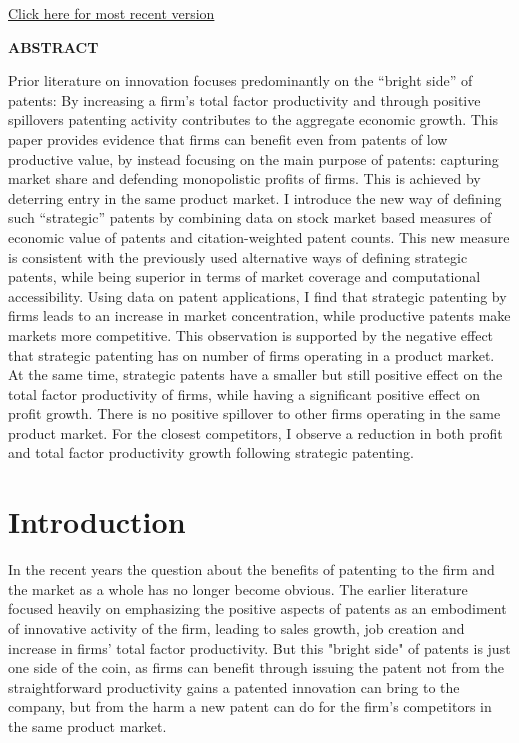 \documentclass[11pt]{article}
\begin{document}
\centerline{\href{https://drive.google.com/open?id=16sPbbTuUI3Qpzp1b1G8gfT1VrnZ90d62}{Click here for most recent version}}
\centerline{\bf ABSTRACT}
  \noindent 
  Prior literature on innovation focuses predominantly on the “bright side” of patents: By increasing a firm’s total factor productivity and through positive spillovers patenting activity contributes to the aggregate economic growth. This paper provides evidence that firms can benefit even from patents of low productive value, by instead focusing on the main purpose of patents: capturing market share and defending monopolistic profits of firms. This is achieved by deterring entry in the same product market. I introduce the new way of defining such “strategic” patents by combining data on stock market based measures of economic value of patents and citation-weighted patent counts. This new measure is consistent with the previously used alternative ways of defining strategic patents, while being superior in terms of market coverage and computational accessibility. Using data on patent applications, I find that strategic patenting by firms leads to an increase in market concentration, while productive patents make markets more competitive. This observation is supported by the negative effect that strategic patenting has on number of firms operating in a product market. At the same time, strategic patents have a smaller but still positive effect on the total factor productivity of firms, while having a significant positive effect on profit growth. There is no positive spillover to other firms operating in the same product market. For the closest competitors, I observe a reduction in both profit and total factor productivity growth following strategic patenting. 
  

\medskip


\clearpage

\section{Introduction} \label{sec:Intro}

 In the recent years the question about the benefits of patenting to the firm and the market as a whole has no longer become obvious. The earlier literature focused heavily on emphasizing the positive aspects of patents as an embodiment of innovative activity of the firm, leading to sales growth, job creation and increase in firms' total factor productivity. But this "bright side" of patents is just one side of the coin, as firms can benefit through issuing the patent not from the straightforward productivity gains a patented innovation can bring to the company, but from the harm a new patent can do for the firm's competitors in the same product market. 
\end{document}
